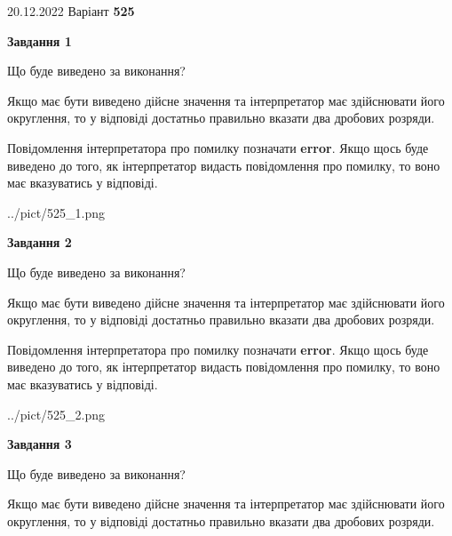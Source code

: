 \documentclass[12pt, ukrainian]{article}
\begin{document}
{20.12.2022 Варіант \No \textbf { 525 }\par}
{
\begin {Large}

{\begin {center}\textbf{Завдання 1}\end {center}}\par
Що буде виведено за виконання? \par

Якщо має бути виведено дійсне значення та інтерпретатор має здійснювати його округлення, 
то у відповіді достатньо правильно вказати два дробових розряди.

Повідомлення інтерпретатора про помилку позначати \textbf{error}.
Якщо щось буде виведено до того, як інтерпретатор видасть повідомлення про помилку, 
то воно має вказуватись у відповіді. \par

\begin{center}
	{../pict/525_1.png}
\end{center}
\newpage

{\begin {center}\textbf{Завдання 2}\end {center}}\par
Що буде виведено за виконання? \par

Якщо має бути виведено дійсне значення та інтерпретатор має здійснювати його округлення, 
то у відповіді достатньо правильно вказати два дробових розряди.

Повідомлення інтерпретатора про помилку позначати \textbf{error}.
Якщо щось буде виведено до того, як інтерпретатор видасть повідомлення про помилку, 
то воно має вказуватись у відповіді. \par

\begin{center}
	{../pict/525_2.png}
\end{center}
\newpage

{\begin {center}\textbf{Завдання 3}\end {center}}\par
Що буде виведено за виконання? \par

Якщо має бути виведено дійсне значення та інтерпретатор має здійснювати його округлення, 
то у відповіді достатньо правильно вказати два дробових розряди.


\end{Large}}
\end{document}
